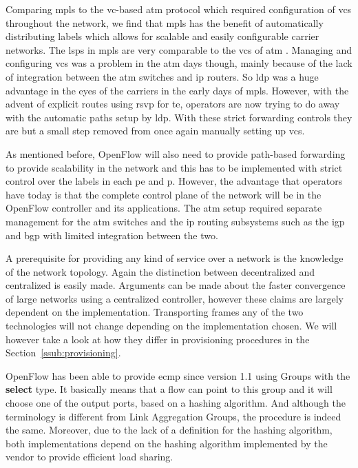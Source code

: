 Comparing \ac{mpls} to the \ac{vc}-based \ac{atm} protocol which required configuration of \acp{vc} throughout the network, we find that \ac{mpls} has the benefit of automatically distributing labels which allows for scalable and easily configurable carrier networks. The \acp{lsp} in \ac{mpls} are very comparable to the \acp{vc} of \ac{atm} \cite{mpls-tunnels}. Managing and configuring \acp{vc} was a problem in the \ac{atm} days though, mainly because of the lack of integration between the \ac{atm} switches and \ac{ip} routers. So \ac{ldp} was a huge advantage in the eyes of the carriers in the early days of \ac{mpls}. However, with the advent of explicit routes using \ac{rsvp} for \acl{te}, operators are now trying to do away with the automatic paths setup by \ac{ldp}. With these strict forwarding controls they are but a small step removed from once again manually setting up \acp{vc}. 

As mentioned before, OpenFlow will also need to provide path-based forwarding to provide scalability in the network and this has to be implemented with strict control over the labels in each \ac{pe} and \ac{p}. However, the advantage that operators have today is that the complete control plane of the network will be in the OpenFlow controller and its applications. The \ac{atm} setup required separate management for the \ac{atm} switches and the \ac{ip} routing subsystems such as the \ac{igp} and \ac{bgp} with limited integration between the two.

A prerequisite for providing any kind of service over a network is the knowledge of the network topology. Again the distinction between decentralized and centralized is easily made. Arguments can be made about the faster convergence of large networks using a centralized controller, however these claims are largely dependent on the implementation. Transporting frames any of the two technologies will not change depending on the implementation chosen. We will however take a look at how they differ in provisioning procedures in the Section~\ref{ssub:provisioning}.

OpenFlow has been able to provide \ac{ecmp} since version 1.1 using Groups with the \textbf{select} type. It basically means that a flow can point to this group and it will choose one of the output ports, based on a hashing algorithm. And although the terminology is different from Link Aggregation Groups, the procedure is indeed the same. Moreover, due to the lack of a definition for the hashing algorithm, both implementations depend on the hashing algorithm implemented by the vendor to provide efficient load sharing.

